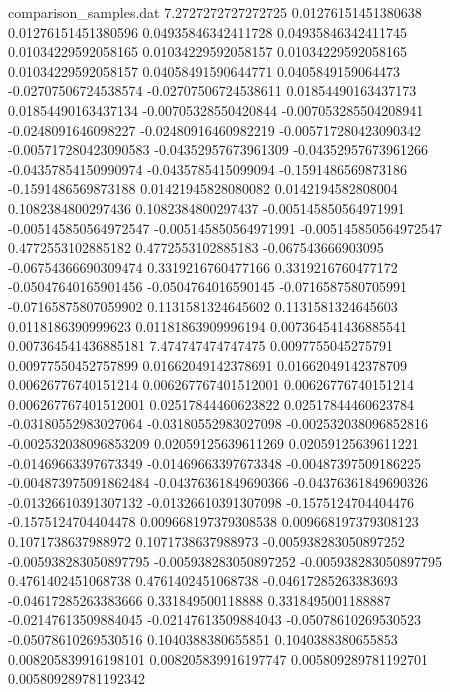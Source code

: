 \begin{filecontents}{comparison_samples.dat}
7.2727272727272725  0.01276151451380638     0.01276151451380596     0.04935846342411728    0.04935846342411745    0.01034229592058165    0.01034229592058157    0.01034229592058165    0.01034229592058157    0.04058491590644771    0.0405849159064473     -0.02707506724538574    -0.02707506724538611    0.01854490163437173    0.01854490163437134    -0.00705328550420844    -0.007053285504208941   -0.0248091646098227     -0.02480916460982219    -0.005717280423090342   -0.005717280423090583   -0.04352957673961309    -0.04352957673961266    -0.04357854150990974    -0.0435785415099094     -0.1591486569873186     -0.1591486569873188     0.01421945828080082    0.0142194582808004     0.1082384800297436     0.1082384800297437     -0.005145850564971991   -0.005145850564972547   -0.005145850564971991   -0.005145850564972547   0.4772553102885182     0.4772553102885183     -0.067543666903095      -0.06754366690309474    0.3319216760477166     0.3319216760477172     -0.05047640165901456    -0.0504764016590145     -0.0716587580705991     -0.07165875807059902    0.1131581324645602     0.1131581324645603     0.0118186390999623     0.01181863909996194    0.007364541436885541    0.007364541436885181  
7.474747474747475   0.0097755045275791      0.00977550452757899     0.01662049142378691    0.01662049142378709    0.00626776740151214    0.006267767401512001   0.00626776740151214    0.006267767401512001   0.02517844460623822    0.02517844460623784    -0.03180552983027064    -0.03180552983027098    -0.002532038096852816  -0.002532038096853209  0.02059125639611269     0.02059125639611221     -0.01469663397673349    -0.01469663397673348    -0.00487397509186225    -0.004873975091862484   -0.04376361849690366    -0.04376361849690326    -0.01326610391307132    -0.01326610391307098    -0.1575124704404476     -0.1575124704404478     0.009668197379308538   0.009668197379308123   0.1071738637988972     0.1071738637988973     -0.005938283050897252   -0.005938283050897795   -0.005938283050897252   -0.005938283050897795   0.4761402451068738     0.4761402451068738     -0.04617285263383693    -0.04617285263383666    0.331849500118888      0.3318495001188887     -0.02147613509884045    -0.02147613509884043    -0.05078610269530523    -0.05078610269530516    0.1040388380655851     0.1040388380655853     0.008205839916198101   0.008205839916197747   0.005809289781192701    0.005809289781192342  

\end{filecontents}
